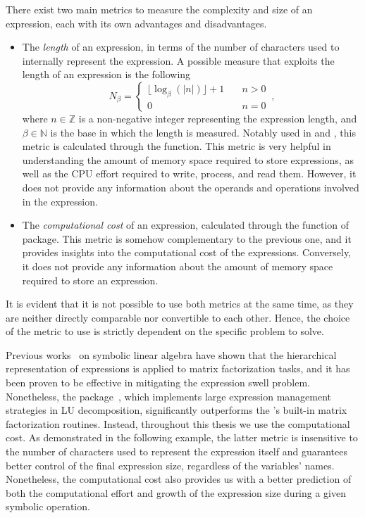 There exist two main metrics to measure the complexity and size of an expression, each with its own advantages and disadvantages.
%
\begin{itemize}
  \setlength\itemsep{0.0em}
  \item The \emph{length} of an expression, in terms of the number of characters used to internally represent the expression. A possible measure that exploits the length of an expression is the following
  \begin{equation*}
    N_\beta = \begin{cases}
      \lfloor\log_{\beta}(|n|)\rfloor + 1 & \quad n > 0 \\
      0                                   & \quad n = 0
    \end{cases} \, \text{,}
  \end{equation*}
  where $n \in \mathbb{Z}$ is a non-negative integer representing the expression length, and $\beta \in \mathbb{N}$ is the base in which the length is measured.
  Notably used in \citet{carette2006linear} and \citet{zhou2006hierarchical}, this metric is calculated through the  \Maple{} function. This metric is very helpful in understanding the amount of memory space required to store expressions, as well as the \ac{CPU} effort required to write, process, and read them. However, it does not provide any information about the operands and operations involved in the expression.
  \item The \emph{computational cost} of an expression, calculated through the  function of  package. This metric is somehow complementary to the previous one, and it provides insights into the computational cost of the expressions. Conversely, it does not provide any information about the amount of memory space required to store an expression.
\end{itemize}
%
It is evident that it is not possible to use both metrics at the same time, as they are neither directly comparable nor convertible to each other. Hence, the choice of the metric to use is strictly dependent on the specific problem to solve.

Previous works~\cite{carette2006linear, zhou2006hierarchical} on symbolic linear algebra have shown that the hierarchical representation of expressions is applied to matrix factorization tasks, and it has been proven to be effective in mitigating the expression swell problem. Nonetheless, the \LULEM{} package~\cite{carette2006linear}, which implements large expression management strategies in \ac{LU} decomposition, significantly outperforms the \Maple{}'s built-in matrix factorization routines. Instead, throughout this thesis we use the computational cost. As demonstrated in the following example, the latter metric is insensitive to the number of characters used to represent the expression itself and guarantees better control of the final expression size, regardless of the variables' names. Nonetheless, the computational cost also provides us with a better prediction of both the computational effort and growth of the expression size during a given symbolic operation.

